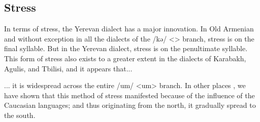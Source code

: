 \begin{table}[H]
	\centering
	\caption{Sound changes from CA /ɾ/ <> in the Yerevan dialect}
	\label{tab:Yerevan:SoundChange:Consonant:r}
\end{table}




\subsection{Stress}\label{sec:Yerevan:phono:stress}

In terms of stress, the Yerevan dialect has a major innovation. In Old Armenian and without exception in all the dialects of the /kə/ <> branch, stress is on the final syllable. But in the Yerevan dialect, stress is on the penultimate syllable. This form of stress also exists to a greater extent in the dialects of Karabakh, Agulis, and Tbilisi, and it appears that... 



\begin{adjarianpage}\label{page:41}\end{adjarianpage}%

... it is widespread across the entire /um/ <um> branch. In other places \citep[185]{Adjarian-1901-Kharabagh}, we have shown that this method of stress manifested because of the influence of the Caucasian languages; and thus originating from the north, it gradually spread to the south. 


